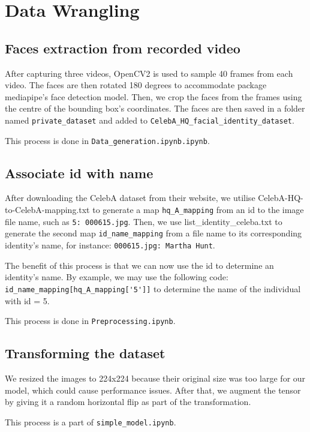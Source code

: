 \section{Data Wrangling}


\subsection{Faces extraction from recorded video}

After capturing three videos, OpenCV2 is used to sample 40 frames from each video. The faces are then rotated 180 degrees to accommodate package mediapipe's face detection model. Then, we crop the faces from the frames using the centre of the bounding box's coordinates. The faces are then saved in a folder named \verb|private_dataset| and added to \verb|CelebA_HQ_facial_identity_dataset|.

This process is done in \verb|Data_generation.ipynb.ipynb|.


\subsection{Associate id with name}

After downloading the CelebA dataset from their website, we utilise CelebA-HQ-to-CelebA-mapping.txt to generate a map \verb|hq_A_mapping| from an id to the image file name, such as \verb|5: 000615.jpg|.
Then, we use list\_identity\_celeba.txt to generate the second map \verb|id_name_mapping| from a file name to its corresponding identity's name, for instance: \verb|000615.jpg: Martha Hunt|.

The benefit of this process is that we can now use the id to determine an identity's name. By example, we may use the following code: \verb|id_name_mapping[hq_A_mapping['5']]| to determine the name of the individual with id = 5.

This process is done in \verb|Preprocessing.ipynb|.

\subsection{Transforming the dataset}

We resized the images to 224x224 because their original size was too large for our model, which could cause performance issues. After that, we augment the tensor by giving it a random horizontal flip as part of the transformation.

This process is a part of \verb|simple_model.ipynb|.
